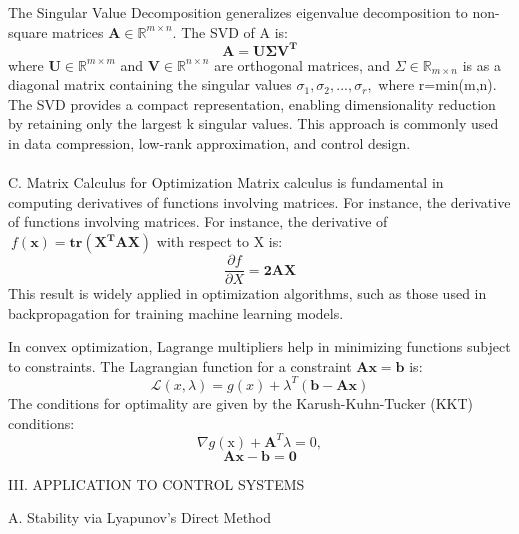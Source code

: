 \documentclass{article}
\begin{document}
\begin{multicols}{2}
			The Singular Value Decomposition generalizes eigenvalue
			decomposition to non-square matrices \(\mathbf{A}\in \mathbb{R}^{m\times n} \). The SVD of A is:
			\begin{equation}
				\mathbf{A=U \Sigma V^T}
			\end{equation}
			where $\mathbf{U}\in\mathbb{R}^{m\times m}$ and $\mathbf{V}\in\mathbb{R}^{n\times n}$ are orthogonal matrices, and $\Sigma \in \mathbb{R}_{m\times n}$ is as a diagonal matrix containing the singular values $ \sigma_{1}, \sigma_{2},...,\sigma_{r},$ where r=min(m,n).
		\newcolumn
		The SVD provides a compact representation, enabling dimensionality reduction by retaining only the largest k singular
		values. This approach is commonly used in data compression,
		low-rank approximation, and control design.\\ \\
		C. Matrix Calculus for Optimization
		\vspace{0.5em}
		Matrix calculus is fundamental in computing derivatives of functions involving matrices. For instance, the derivative of functions involving matrices. For instance, the derivative of \(\ f\mathbf{(x)=tr(X^TAX)}\) with respect to X is:
		\begin{equation}
			\frac{\partial f}{\partial X}=\mathbf{2AX}
		\end{equation}
		This result is widely applied in optimization algorithms, such
		as those used in backpropagation for training machine learning
		models.
		
		In convex optimization, Lagrange multipliers help in minimizing functions subject to constraints. The Lagrangian function for a constraint $\mathbf{Ax = b}$ is:
		\begin{equation}
				\mathcal{L}(x,\lambda)=g(x)+\lambda^T(\mathbf{b-Ax})
		\end{equation}
		The conditions for optimality are given by the Karush-Kuhn-Tucker (KKT) conditions:
		\begin{equation}
			\nabla g(\mathrm{x})+\mathbf{A}^T\lambda =0,
		\end{equation}
		\vspace{-2em}
		\begin{equation}
			\mathbf{Ax-b=0}
		\end{equation}
		\begin{center}
			III. APPLICATION TO CONTROL SYSTEMS
		\end{center}
		\vspace{-1em}
		A. Stability via Lyapunov’s Direct Method
		

\end{multicols}
\end{document}
